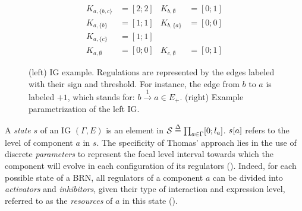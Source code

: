 \begin{figure}[t]
\begin{minipage}{0.4\linewidth}
\centering
{}
\end{minipage}
\begin{minipage}{0.6\linewidth}
\centering
\begin{align*}
K_{a,\{b,c\}} &= [2 ; 2] & K_{b,\emptyset} &= [0 ; 1] \\
K_{a,\{b\}} &= [1 ; 1] & K_{b,\{a\}} &= [0 ; 0] \\
K_{a,\{c\}} &= [1 ; 1] &&\\
K_{a,\emptyset} &= [0 ; 0] & K_{c,\emptyset} &= [0 ; 1]
\end{align*}
\end{minipage}
\caption{\label{fig:runningBRN}
(left)
IG example.
Regulations are represented by the edges labeled with their sign and threshold.
For instance, the edge from $b$ to $a$ is labeled $+1$, which stands for: $b \xrightarrow{1} a \in
E_+$.
(right)
Example parametrization of the left IG.
}
\end{figure}

A \emph{state} $s$ of an IG $(\Gamma, E)$ is an element in $\mathcal{S} \stackrel{\Delta}= \prod_{a \in \Gamma} [0;l_a]$.
${s[a]}$ refers to the level of component $a$ in $s$.
The specificity of Thomas' approach lies in the use of discrete \emph{parameters} to represent the
focal level interval towards which the component will evolve in each configuration of its regulators
().
Indeed, for each possible state of a BRN, all regulators of a component $a$ can be divided into
\emph{activators} and \emph{inhibitors}, given their type of interaction and expression level,
referred to as the \emph{resources} of $a$ in this state ().

